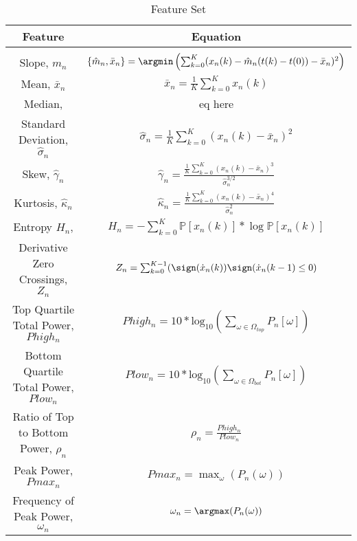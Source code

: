 \begin{table*}[t]
\caption{Feature Set} %
\centering %
\begin{tabular}{c c} %
\hline\hline %
Feature & Equation \\ [0.5ex] %
\hline \\ [0.5ex] %
Slope, $\hat{m}_n$ & $\{\hat{m}_n, \bar{x}_n\} =
\argmin\left(\sum_{k=0}^{K}
(x_n(k)-\hat{m}_n(t(k)-t(0))-\bar{x}_n)^2\right) $ \\ [1ex] %
Mean, $\bar{x}_n$ & $\bar{x}_n = \frac{1}{K} \sum_{k=0}^{K} x_n(k)$ \\ [1ex]

Median,  & eq here \\ [1ex]

Standard Deviation, $\hat{\sigma}_n$ & $\hat{\sigma}_n = \frac{1}{K}
\sum_{k=0}^{K} (x_n(k)-\bar{x}_n)^2 $ \\ [1ex]

Skew, $\hat{\gamma}_n$ & $\hat{\gamma}_n = \frac{\frac{1}{K}
\sum_{k=0}^{K} (x_n(k)-\bar{x}_n)^3}{\hat{\sigma}_n^{3/2}} $ \\ [1ex]

Kurtosis, $\hat{\kappa}_n$ & $\hat{\kappa}_n = \frac{\frac{1}{K}
  \sum_{k=0}^{K} (x_n(k)-\bar{x}_n)^4}{\hat{\sigma}_n^2} $ \\ [1ex]

Entropy $H_n$, & $H_n = - \sum_{k=0}^{K} \mathbb{P}[x_n(k)] * \log \mathbb{P}[x_n(k)]$ \\ [1ex] 

Derivative Zero Crossings, $Z_n$ & $Z_n = \sum_{k=0}^{K-1} (\sign(\dot{x}_n(k))\sign(\dot{x}_n(k-1) \leq 0) $ \\ [1ex] 
Top Quartile Total Power, $Phigh_n$  & $Phigh_n = 10*\text{log}_{10}(\sum_{\omega\in\Omega_{top}} P_n[\omega])  $ \\ [1ex] 
Bottom Quartile Total Power, $Plow_n$  & $Plow_n = 10*\text{log}_{10}(\sum_{\omega\in\Omega_{bot}} P_n[\omega])  $ \\ [1ex] 
Ratio of Top to Bottom Power, $\rho_n$  & $\rho_n = \frac{Phigh_n}{Plow_n}  $ \\ [1ex]  %
Peak Power, $Pmax_n$ & $Pmax_n = \max_\omega(P_n(\omega))$  \\ [1ex]
Frequency of Peak Power, $\omega_n$ & $\omega_n = \argmax(P_n(\omega))$  \\ [1ex]
\hline %
\end{tabular}
\label{table:features} %
\end{table*}


